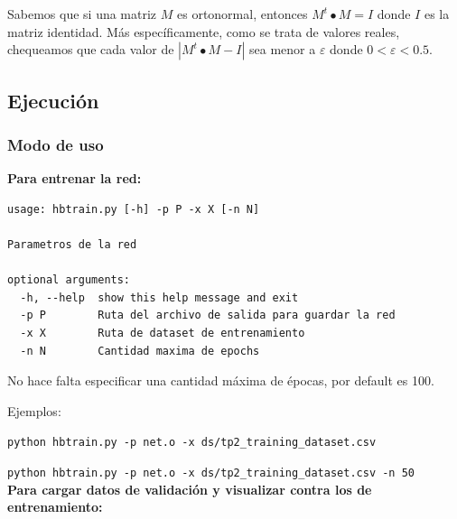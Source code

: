 
Sabemos que si una matriz $M$ es ortonormal, entonces $M^t \bullet M = I$ donde $I$ es la matriz identidad. Más específicamente, como se trata de valores reales, chequeamos que cada valor de $|M^t \bullet M - I|$ sea menor a $ \varepsilon $ donde $0 < \varepsilon < 0.5$.


\subsection{Ejecución}

\subsubsection{Modo de uso}

\textbf{Para entrenar la red:}

\begin{lstlisting}[style=bash]
usage: hbtrain.py [-h] -p P -x X [-n N]

Parametros de la red

optional arguments:
  -h, --help  show this help message and exit
  -p P        Ruta del archivo de salida para guardar la red
  -x X        Ruta de dataset de entrenamiento
  -n N        Cantidad maxima de epochs
\end{lstlisting}

No hace falta especificar una cantidad máxima de épocas, por default es 100.

Ejemplos: 

\noindent\texttt{python hbtrain.py -p net.o -x ds/tp2\_training\_dataset.csv}

\noindent\texttt{python hbtrain.py -p net.o -x ds/tp2\_training\_dataset.csv -n 50} \\

\textbf{Para cargar datos de validación y visualizar contra los de entrenamiento:}


